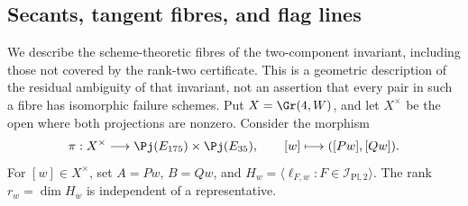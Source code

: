 \subsection{Secants, tangent fibres, and flag lines}
\label{sec:exceptional-reconstruction-fibres}

We describe the scheme-theoretic fibres of the two-component invariant,
including those not covered by the rank-two certificate.  This is a
geometric description of the residual ambiguity of that invariant,
not an assertion that every pair in such a fibre has isomorphic
failure schemes.
Put \(X=\Gr(4,W)\), and let \(X^\times\) be the open where
both projections are nonzero.  Consider the morphism
\[
 \pi:X^\times\longrightarrow\Pj(E_{175})\times\Pj(E_{35}),
       \qquad [w]\longmapsto([Pw],[Qw]).
\]
For \([w]\in X^\times\), set \(A=Pw\), \(B=Qw\), and
\(H_w=\langle\ell_{F,w}:F\in\mathcal I_{\mathrm{Pl},2}\rangle\).
The rank \(r_w=\dim H_w\) is independent of a representative.

